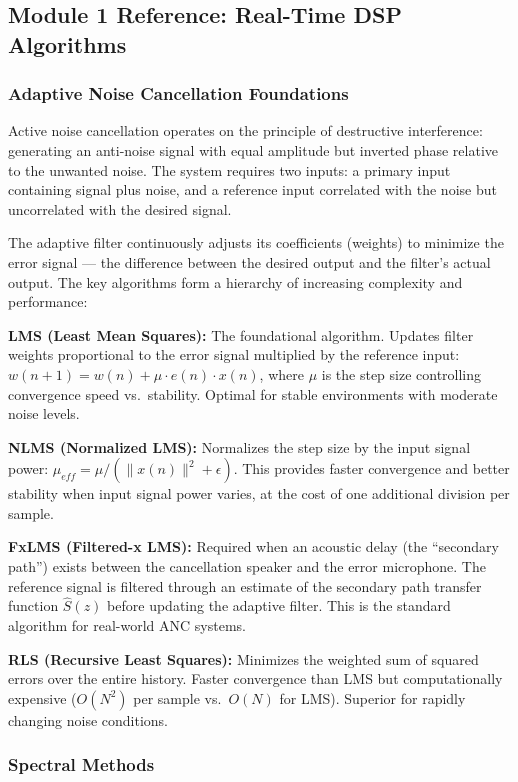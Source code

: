 \documentclass[11pt,letterpaper]{article}
\begin{document}
\subsection{Module 1 Reference: Real-Time DSP Algorithms}

\subsubsection{Adaptive Noise Cancellation Foundations}

Active noise cancellation operates on the principle of destructive interference: generating an anti-noise signal with equal amplitude but inverted phase relative to the unwanted noise. The system requires two inputs: a primary input containing signal plus noise, and a reference input correlated with the noise but uncorrelated with the desired signal.

The adaptive filter continuously adjusts its coefficients (weights) to minimize the error signal --- the difference between the desired output and the filter's actual output. The key algorithms form a hierarchy of increasing complexity and performance:

\textbf{LMS (Least Mean Squares):} The foundational algorithm. Updates filter weights proportional to the error signal multiplied by the reference input: $w(n+1) = w(n) + \mu \cdot e(n) \cdot x(n)$, where $\mu$ is the step size controlling convergence speed vs.\ stability. Optimal for stable environments with moderate noise levels.

\textbf{NLMS (Normalized LMS):} Normalizes the step size by the input signal power: $\mu_{eff} = \mu / (\|x(n)\|^2 + \epsilon)$. This provides faster convergence and better stability when input signal power varies, at the cost of one additional division per sample.

\textbf{FxLMS (Filtered-x LMS):} Required when an acoustic delay (the ``secondary path'') exists between the cancellation speaker and the error microphone. The reference signal is filtered through an estimate of the secondary path transfer function $\hat{S}(z)$ before updating the adaptive filter. This is the standard algorithm for real-world ANC systems.

\textbf{RLS (Recursive Least Squares):} Minimizes the weighted sum of squared errors over the entire history. Faster convergence than LMS but computationally expensive ($O(N^2)$ per sample vs.\ $O(N)$ for LMS). Superior for rapidly changing noise conditions.

\subsubsection{Spectral Methods}
\end{document}
